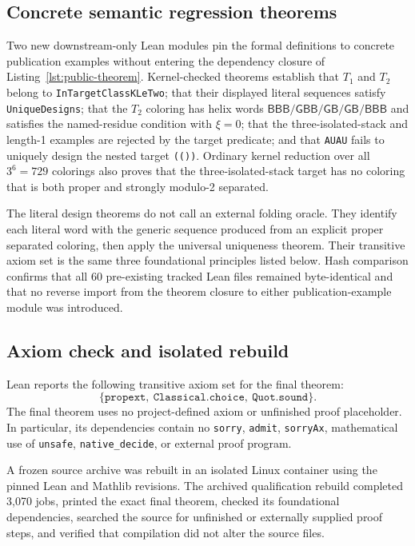\documentclass[11pt]{article}
\newcommand{\Bcol}{\mathsf{B}}
\newcommand{\Gray}{\mathsf{G}}
\begin{document}
\subsection{Concrete semantic regression theorems}

Two new downstream-only Lean modules pin the formal definitions to concrete publication examples without entering the dependency closure of Listing~\ref{lst:public-theorem}.  Kernel-checked theorems establish that $T_1$ and $T_2$ belong to \texttt{InTargetClassKLeTwo}; that their displayed literal sequences satisfy \texttt{UniqueDesigns}; that the $T_2$ coloring has helix words $\Bcol\Bcol\Bcol/\Gray\Bcol\Bcol/\Gray\Bcol/\Gray\Bcol/\Bcol\Bcol\Bcol$ and satisfies the named-residue condition with $\xi=0$; that the three-isolated-stack and length-1 examples are rejected by the target predicate; and that \texttt{AUAU} fails to uniquely design the nested target \texttt{(())}.  Ordinary kernel reduction over all $3^6=729$ colorings also proves that the three-isolated-stack target has no coloring that is both proper and strongly modulo-2 separated.

The literal design theorems do not call an external folding oracle.  They identify each literal word with the generic sequence produced from an explicit proper separated coloring, then apply the universal uniqueness theorem.  Their transitive axiom set is the same three foundational principles listed below.  Hash comparison confirms that all 60 pre-existing tracked Lean files remained byte-identical and that no reverse import from the theorem closure to either publication-example module was introduced.

\subsection{Axiom check and isolated rebuild}

Lean reports the following transitive axiom set for the final theorem:
\[
\{\texttt{propext},\ \texttt{Classical.choice},\ \texttt{Quot.sound}\}.
\]
The final theorem uses no project-defined axiom or unfinished proof placeholder.  In particular, its dependencies contain no \texttt{sorry}, \texttt{admit}, \texttt{sorryAx}, mathematical use of \texttt{unsafe}, \texttt{native\_decide}, or external proof program.

A frozen source archive was rebuilt in an isolated Linux container using the pinned Lean and Mathlib revisions.  The archived qualification rebuild completed 3,070 jobs, printed the exact final theorem, checked its foundational dependencies, searched the source for unfinished or externally supplied proof steps, and verified that compilation did not alter the source files.
\end{document}
